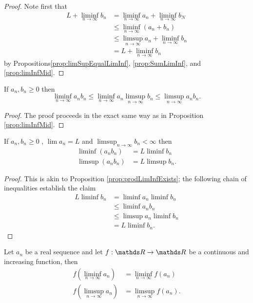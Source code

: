 \begin{proof}
Note first that 
\begin{align*}
L+\liminf_{n\to\infty}b_{n} & =\liminf_{n\to\infty}a_{n}+\liminf_{n\to\infty}b_{N}\\
 & \leq\liminf_{n\to\infty}\left(a_{n}+b_{n}\right)\\
 & \leq\limsup_{n\to\infty}a_{n}+\liminf_{n\to\infty}b_{n}\\
 & =L+\liminf_{n\to\infty}b_{n}
\end{align*}
by Propositions\ref{prop:limSupEqualLimInf}, \ref{prop:SumLimInf},
and \ref{prop:limInfMid}.
\end{proof}
\begin{prop}
If $a_{n},b_{n}\geq0$ then
\[
\liminf_{n\to\infty}a_{n}b_{n}\leq\liminf_{n\to\infty}a_{n}\limsup_{n\to\infty}b_{n}\leq\limsup_{n\to\infty}a_{n}b_{n}.
\]
\end{prop}

\begin{proof}
The proof proceeds in the exact same way as in Proposition \ref{prop:limInfMid}.
\end{proof}
%
\begin{prop}
\label{prop:prodLimInfExists}If $a_{n},b_{n}\geq0$ , $\lim a_{n}=L$
and $\limsup_{n\to\infty}b_{n}<\infty$ then 
\begin{align*}
\liminf\left(a_{n}b_{n}\right) & =L\liminf b_{n}\\
\limsup\left(a_{n}b_{n}\right) & =L\limsup b_{n}.
\end{align*}
\end{prop}

\begin{proof}
This is akin to Proposition \ref{prop:prodLimInfExists}; the following
chain of inequalities establish the claim
\begin{align*}
L\liminf b_{n} & =\liminf a_{n}\liminf b_{n}\\
 & \leq\liminf a_{n}b_{n}\\
 & \leq\limsup a_{n}\liminf b_{n}\\
 & =L\liminf b_{n}.
\end{align*}
\end{proof}
\begin{prop}
\label{prop:limInfContinuity}Let $a_{n}$ be a real sequence and
let $f:\R\to\R$ be a continuous and increasing function, then
\begin{align*}
f\left(\liminf_{n\to\infty}a_{n}\right) & =\liminf_{n\to\infty}f\left(a_{n}\right)\\
f\left(\limsup_{n\to\infty}a_{n}\right) & =\limsup_{n\to\infty}f\left(a_{n}\right).
\end{align*}
\end{prop}

